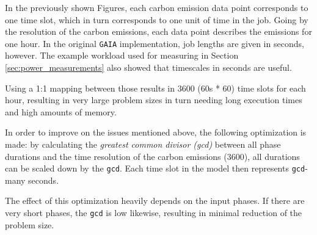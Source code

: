 In the previously shown Figures, each carbon emission data point corresponds to one time slot, which in turn corresponds to one unit of time in the job. 
Going by the resolution of the carbon emissions, each data point describes the emissions for one hour. 
In the original \verb|GAIA| implementation, job lengths are given in seconds, however. 
The example workload used for measuring in Section \ref{sec:power_measurements} also showed that timescales in seconds are useful. 

Using a 1:1 mapping between those results in 3600 (60s * 60) time slots for each hour, resulting in very large problem sizes in turn needing long execution times and high amounts of memory.

In order to improve on the issues mentioned above, the following optimization is made: by calculating the \emph{greatest common divisor (gcd)} between all phase durations and the time resolution of the carbon emissions (3600), all durations can be scaled down by the \verb|gcd|. Each time slot in the model then represents \verb|gcd|-many seconds.

The effect of this optimization heavily depends on the input phases. 
If there are very short phases, the \verb|gcd| is low likewise, resulting in minimal reduction of the problem size.
